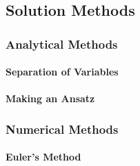 






\subsection{Solution Methods}

\subsubsection{Analytical Methods}

\paragraph{Separation of Variables}

\paragraph{Making an Ansatz}



\subsubsection{Numerical Methods}

\paragraph{Euler's Method}

